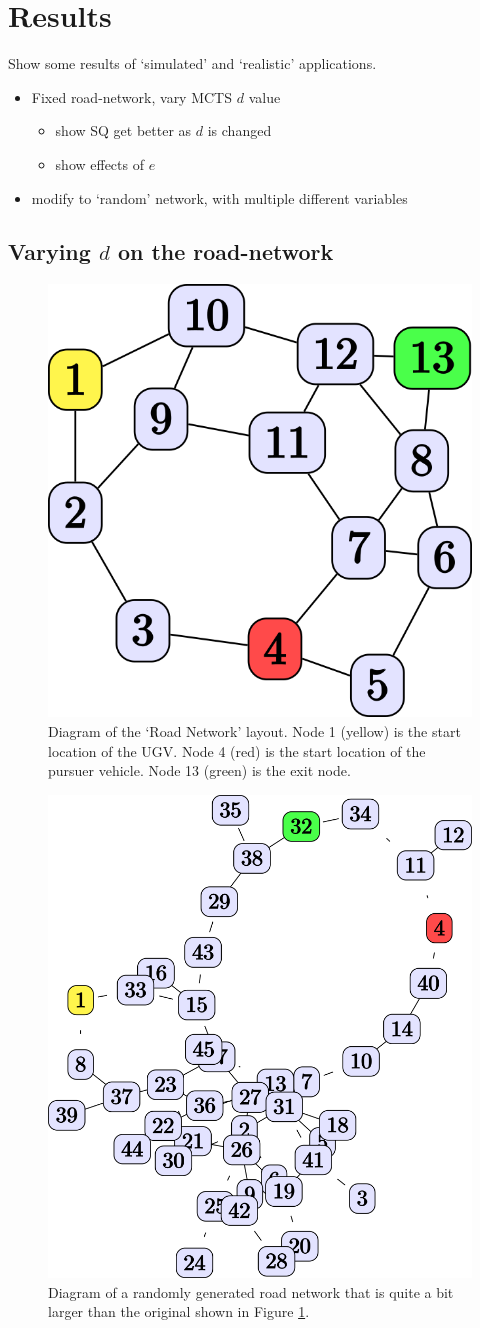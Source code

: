 \section{Results}
Show some results of `simulated' and `realistic' applications.

\begin{itemize}
    \item Fixed road-network, vary MCTS $d$ value
    \begin{itemize}
        \item show SQ get better as $d$ is changed 
        \item show effects of $e$
    \end{itemize}
    \item modify to `random' network, with multiple different variables
\end{itemize}

\subsection{Varying $d$ on the road-network}

\begin{figure}[htbp]
    \centering
    \includegraphics[width=0.4\linewidth]{Figures/original_roadnet.png}
    \caption{Diagram of the `Road Network' layout. Node 1 (yellow) is the start location of the UGV. Node 4 (red) is the start location of the pursuer vehicle. Node 13 (green) is the exit node.}
    \label{fig:roadnet}
\end{figure}
\begin{figure}[htbp]
    \centering
    \includegraphics[width=0.4\linewidth]{Figures/medium_roadnet.png}
    \caption{Diagram of a randomly generated road network that is quite a bit larger than the original shown in Figure \ref{fig:roadnet}.}
    \label{fig:med_roadnet}
\end{figure}

